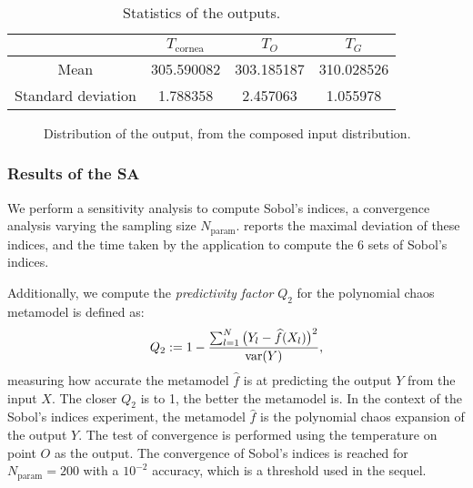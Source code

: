 \begin{table}
    \centering
    \begin{tabular}{cccc}
        \toprule
        & $T_\text{cornea}$ & $T_O$ & $T_G$ \\
        \midrule
        Mean & 305.590082 & 303.185187 & 310.028526 \\
        Standard deviation & 1.788358 & 2.457063 & 1.055978 \\
        \bottomrule
    \end{tabular}
    \caption{Statistics of the outputs.}
    \label{tab:results:uncertainty-propagation}
\end{table}


\begin{figure}
    \centering
    
    \caption{Distribution of the output, from the composed input distribution.}
    \label{fig:uncertainty-propagation}
\end{figure}






\subsubsection{Results of the SA}

We perform a sensitivity analysis to compute Sobol's indices, a convergence analysis varying the sampling size $N_\text{param}$.
 reports the maximal deviation of these indices, and the time taken by the application to compute the 6 sets of Sobol's indices.

Additionally, we compute the \emph{predictivity factor} $Q_2$ for the polynomial chaos metamodel is defined as:
\begin{equation}
    Q_2:= 1 - \dfrac{\sum_{l=1}^{N}\big(Y_l - \widehat{f}(X_l)\big)^2}{\mathrm{var}(Y)},
\end{equation}
measuring how accurate the metamodel $\widehat{f}$ is at predicting the output $Y$ from the input $X$.
The closer $Q_2$ is to 1, the better the metamodel is.
In the context of the Sobol's indices experiment, the metamodel $\widehat{f}$ is the polynomial chaos expansion of the output $Y$.
The test of convergence is performed using the temperature on point $O$ as the output.
The convergence of Sobol's indices is reached for $N_\text{param} = 200$ with a $10^{-2}$ accuracy, which is a threshold used in the sequel.

